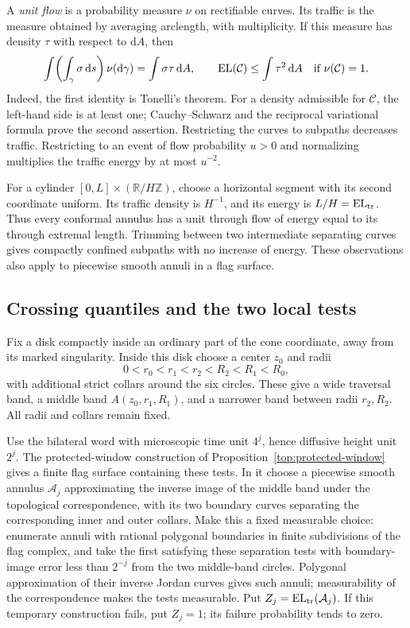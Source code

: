 \documentclass[11pt]{article}
\numberwithin{equation}{section}
\theoremstyle{definition}
\theoremstyle{remark}
\newcommand{\1}{\mathbf 1}
\begin{document}
A \emph{unit flow} is a probability measure \(\nu\) on rectifiable
curves.  Its traffic is the measure obtained by averaging arclength,
with multiplicity.  If this measure has density \(\tau\) with respect
to \(\mathrm d A\), then
\begin{equation}
 \int\!\left(\int_\gamma\sigma\,\mathrm d s\right)\nu(\mathrm d\gamma)
   =\int\sigma\tau\,\mathrm d A,
 \qquad
 \operatorname{EL}(\mathcal C)\le\int\tau^2\,\mathrm d A
 \quad\hbox{if }\nu(\mathcal C)=1.
 \label{conf:flow-bound}
\end{equation}
Indeed, the first identity is Tonelli's theorem.  For a density
admissible for \(\mathcal C\), the left-hand side is at least one;
Cauchy--Schwarz and the reciprocal variational formula prove the second
assertion.  Restricting the curves to subpaths decreases traffic.
Restricting to an event of flow probability \(u>0\) and normalizing
multiplies the traffic energy by at most \(u^{-2}\).

For a cylinder \([0,L]\times(\mathbb R/H\mathbb Z)\), choose a horizontal segment
with its second coordinate uniform.  Its traffic density is \(H^{-1}\),
and its energy is \(L/H=\operatorname{EL}_{\rm tr}\).  Thus every conformal annulus
has a unit through flow of energy equal to its through extremal length.
Trimming between two intermediate separating curves gives compactly
confined subpaths with no increase of energy.  These observations also
apply to piecewise smooth annuli in a flag surface.

\subsection{Crossing quantiles and the two local tests}
\label{conf:quantile-subsection}

Fix a disk compactly inside an ordinary part of the cone coordinate,
away from its marked singularity.  Inside this disk choose a center
\(z_0\) and radii
\[
 0<r_0<r_1<r_2<R_2<R_1<R_0,
\]
with additional strict collars around the six circles.  These give a
wide traversal band, a middle band \(A(z_0,r_1,R_1)\), and a narrower
band between radii \(r_2,R_2\).  All radii and collars remain fixed.

Use the bilateral word with microscopic time unit \(4^j\), hence
diffusive height unit \(2^j\).  The protected-window construction of
Proposition~\ref{top:protected-window} gives a finite flag surface
containing these tests.  In it choose a piecewise smooth annulus
\(\mathcal A_j\) approximating the inverse image of the middle
band under the topological correspondence, with its two boundary curves
separating the corresponding inner and outer collars.  Make this a
fixed measurable choice: enumerate annuli with rational polygonal
boundaries in finite subdivisions of the flag complex, and take the
first satisfying these separation tests with boundary-image error
less than \(2^{-j}\) from the two middle-band circles.  Polygonal
approximation of their inverse Jordan curves gives such annuli;
measurability of the correspondence makes the tests measurable.  Put
\(Z_j=\operatorname{EL}_{\rm tr}(\mathcal A_j)\).  If this temporary construction
fails, put \(Z_j=1\); its failure probability tends to zero.
\end{document}
